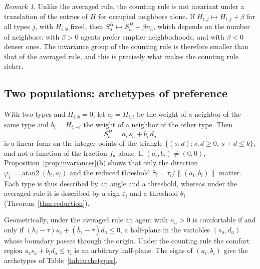 \documentclass{article}
\theoremstyle{remark}
\newtheorem{remark}{Remark}
\begin{document}
\begin{remark}
Unlike the averaged rule, the counting rule is not invariant under a translation of the entries of $H$ for occupied neighbors alone. If $H_{i,j}\mapsto H_{i,j}+\beta$ for all types $j$, with $H_{i,\emptyset}$ fixed, then $S_a^H\mapsto S_a^H+\beta n_a$, which depends on the number of neighbors: with $\beta>0$ agents prefer emptier neighborhoods, and with $\beta<0$ denser ones. The invariance group of the counting rule is therefore smaller than that of the averaged rule, and this is precisely what makes the counting rule richer.
\end{remark}

\subsection{Two populations: archetypes of preference}

With two types and $H_{i,\emptyset}=0$, let $a_i=H_{i,i}$ be the weight of a neighbor of the same type and $b_i=H_{i,-i}$ the weight of a neighbor of the other type. Then
\[
S_a^H=a_i\,s_a+b_i\,d_a \tag{5}
\]
is a linear form on the integer points of the triangle $\{(s,d): s,d\ge 0,\ s+d\le k\}$, and not a function of the fraction $f_a$ alone. If $(a_i,b_i)\neq(0,0)$, Proposition~\ref{prop:invariances}(b) shows that only the direction $\varphi_i=\operatorname{atan2}(b_i,a_i)$ and the reduced threshold $\hat\tau_i=\tau_i/\|(a_i,b_i)\|$ matter. Each type is thus described by an angle and a threshold, whereas under the averaged rule it is described by a sign $\varepsilon_i$ and a threshold $\theta_i$ (Theorem~\ref{thm:reduction}).

Geometrically, under the averaged rule an agent with $n_a>0$ is comfortable if and only if $(h_i-\tau)s_a+(\bar h_i-\tau)d_a\le 0$, a half-plane in the variables $(s_a,d_a)$ whose boundary passes through the origin. Under the counting rule the comfort region $a_i s_a+b_i d_a\le\tau_i$ is an arbitrary half-plane. The signs of $(a_i,b_i)$ give the archetypes of Table~\ref{tab:archetypes}.
\end{document}
